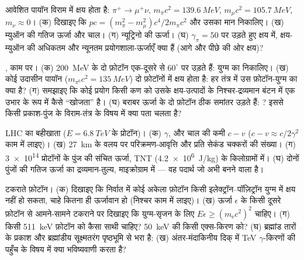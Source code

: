 \begin{exercise}[$\star\star$]\label{exo:b3:relativistic-dynamics:6}
आवेशित पायॉन विराम में क्षय होता है: $\pi^+ \to \mu^+\nu$, $m_\pi c^2 =
\qty{139.6}{MeV}$, $m_\mu c^2 = \qty{105.7}{MeV}$, $m_\nu \approx 0$।
(क) दिखाइए कि $pc = (m_\pi^2 - m_\mu^2)c^4/2m_\pi c^2$ और उसका मान
निकालिए। (ख) म्युऑन की गतिज ऊर्जा और चाल। (ग) न्यूट्रिनो की ऊर्जा।
(घ) $\gamma_\pi = 50$ पर उड़ते हुए क्षय में, क्षय-म्युऑन की अधिकतम और
न्यूनतम प्रयोगशाला-ऊर्जाएँ क्या हैं (आगे और पीछे की ओर क्षय)?
\end{exercise}

\begin{exercise}[$\star\star$]\label{exo:b3:relativistic-dynamics:7}
, काम पर। (क) \qty{200}{MeV} के दो फ़ोटॉन एक-दूसरे से
$60^\circ$ पर उड़ते हैं: युग्म का  निकालिए।
(ख) कोई उदासीन पायॉन ($m_{\pi^0}c^2 = \qty{135}{MeV}$) दो फ़ोटॉनों में
क्षय होता है: हर तंत्र में उस फ़ोटॉन-युग्म का  क्या
है? (ग) समझाइए कि कोई प्रयोग किसी कण को उसके क्षय-उत्पादों के
निश्चर-द्रव्यमान बंटन में एक उभार के रूप में कैसे ``खोजता'' है। (घ)
बराबर ऊर्जा के दो फ़ोटॉन ठीक समांतर उड़ते हैं: ?
इससे किसी प्रकाश-पुंज के विराम-तंत्र के विषय में क्या पता चलता है?
\end{exercise}

\begin{exercise}[$\star\star$]\label{exo:b3:relativistic-dynamics:8}
LHC का बहीखाता ($E = \qty{6.8}{TeV}$ के प्रोटॉन)। (क) $\gamma$, और
चाल की कमी $c - v$ ($c - v \approx c/2\gamma^2$ काम में लाइए)। (ख)
\qty{27}{km} के वलय पर परिक्रमण-आवृत्ति और प्रति सेकंड चक्करों की
संख्या। (ग) \num{3e14} प्रोटॉनों के पुंज की संचित ऊर्जा,
TNT (\qty{4.2e6}{J/kg}) के किलोग्रामों में। (घ) दोनों पुंजों की गतिज
ऊर्जा का द्रव्यमान-तुल्य, माइक्रोग्राम में --- वह पदार्थ जो अभी बनने वाला है।
\end{exercise}

\begin{exercise}[$\star\star$]\label{exo:b3:relativistic-dynamics:9}
टकराते फ़ोटॉन। (क) दिखाइए कि निर्वात में कोई अकेला फ़ोटॉन किसी
इलेक्ट्रॉन--पॉज़िट्रॉन युग्म में क्षय नहीं हो सकता, चाहे कितना ही
ऊर्जावान हो (निश्चर काम में लाइए)। (ख) ऊर्जा $\epsilon$ के किसी दूसरे
फ़ोटॉन से आमने-सामने टकराने पर दिखाइए कि युग्म-सृजन के लिए
$E\epsilon \ge (m_{\text{e}}c^2)^2$ चाहिए। (ग) किसी
\qty{511}{keV} फ़ोटॉन को कैसा साथी चाहिए? \qty{50}{keV} की किसी
एक्स-किरण को? (घ) ब्रह्मांड तारों के प्रकाश और ब्रह्मांडीय सूक्ष्मतरंग
पृष्ठभूमि से भरा है: (ख) अंतर-मंदाकिनीय दिक् में TeV $\gamma$-किरणों की
पहुँच के विषय में क्या भविष्यवाणी करता है?
\end{exercise}

